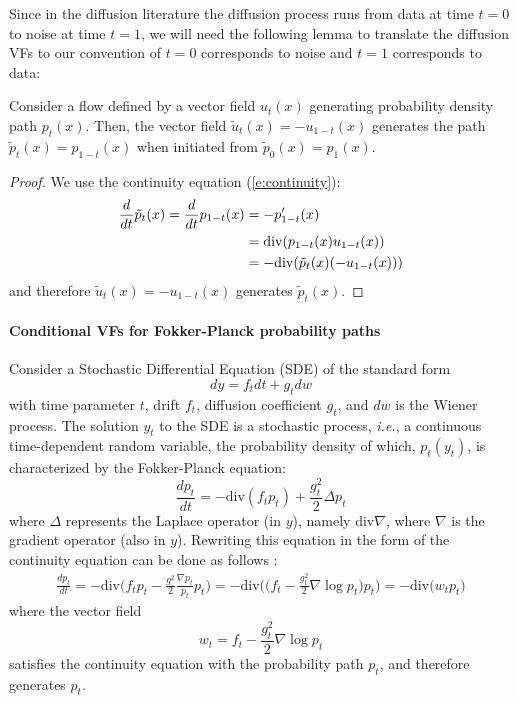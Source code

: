 \documentclass{article}
\makeatletter
\renewcommand*{\ie}{{\it i.e.}\@\xspace}
\makeatother
\begin{document}
Since in the diffusion literature the diffusion process runs from data at time $t=0$ to noise at time $t=1$, we will need the following lemma to translate the diffusion VFs to our convention of $t=0$ corresponds to noise and $t=1$ corresponds to data:
\begin{lemma}\label{lem:reverse}
Consider a flow defined by a vector field $u_t(x)$ generating probability density path $p_t(x)$. Then, the vector field $\tilde{u}_t(x) = -u_{1-t}(x)$ generates the path $\tilde{p}_t(x) = p_{1-t}(x)$ when initiated from $\tilde{p}_0(x) = p_1(x)$.
\end{lemma}
\begin{proof}
We use the continuity equation (\eqref{e:continuity}):
\begin{align*}
    \frac{d}{dt}\tilde{p}_t(x)=\frac{d}{dt}p_{1-t}(x) &= -p'_{1-t}(x) \\
    &= \mathrm{div}(p_{1-t}(x)u_{1-t}(x)) \\
    &= -\mathrm{div}(\tilde{p}_{t}(x)(-u_{1-t}(x))) 
\end{align*}
and therefore $\tilde{u}_t(x)=-u_{1-t}(x)$ generates $\tilde{p}_t(x)$. 
\end{proof}


\paragraph{Conditional VFs for Fokker-Planck probability paths} Consider a Stochastic Differential Equation (SDE) of the standard form
\begin{equation}\label{e:sde}
    dy = f_t dt + g_t dw
\end{equation}
with time parameter $t$, drift $f_t$, diffusion coefficient $g_t$, and $dw$ is the Wiener process. The solution $y_t$ to the SDE is a stochastic process, \ie, a continuous time-dependent random variable, the probability density of which, $p_t(y_t)$, is characterized by the Fokker-Planck equation:
\begin{equation}
    \frac{dp_t}{dt} = -\mathrm{div}(f_t p_t) + \frac{g_t^2}{2}\Delta p_t
\end{equation}
where $\Delta$ represents the Laplace operator (in $y$), namely $\mathrm{div}\nabla$, where $\nabla$ is the gradient operator (also in $y$). Rewriting this equation in the form of the continuity equation can be done as follows \citep{maoutsa2020}:
\begin{align*}
    \frac{dp_t}{dt} 
    = -\mathrm{div}\Big( f_t p_t - \frac{g^2}{2}\frac{\nabla p_t}{p_t}p_t \Big) 
    = -\mathrm{div}\Big(\big( f_t - \frac{g_t^2}{2}\nabla \log p_t\big)p_t \Big) = -\mathrm{div}\Big( w_t p_t \Big)
\end{align*}
where the vector field
\begin{equation}\label{e:w}
    w_t = f_t - \frac{g_t^2}{2}\nabla \log p_t
\end{equation}
satisfies the continuity equation with the probability path $p_t$, and therefore generates $p_t$. 
\end{document}
